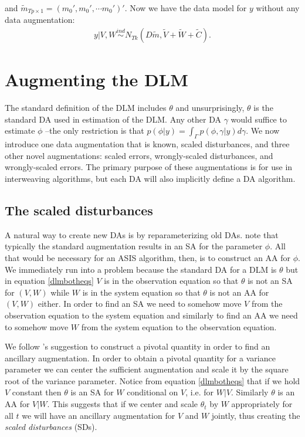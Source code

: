 \documentclass[12pt]{article}
\begin{document}
and $\tilde{m}_{Tp\times 1} = (m_0', m_0', \cdots m_0')'$. Now we have the data model for $y$ without any data augmentation:
\begin{align}
  y|V,W \stackrel{ind}{\sim} N_{Tk}(D\tilde{m}, \tilde{V} + \tilde{W} + \tilde{C}). \label{margmodel}
\end{align}

\section{Augmenting the DLM}\label{sec:DAs}

The standard definition of the DLM includes $\theta$ and unsurprisingly, $\theta$ is the standard DA used in estimation of the DLM. Any other DA $\gamma$ would suffice to estimate $\phi$ --the only restriction is that $p(\phi|y) = \int_{\Gamma} p(\phi,\gamma|y)d\gamma$. We now introduce one data augmentation that is known, scaled disturbances, and three other novel augmentations: scaled errors, wrongly-scaled disturbances, and wrongly-scaled errors. The primary purpose of these augmentations is for use in interweaving algorithms, but each DA will also implicitly define a DA algorithm.

\subsection{The scaled disturbances}\label{sec:DAs:dist}

A natural way to create new DAs is by reparameterizing old DAs. \citet{papaspiliopoulos2007general} note that typically the standard augmentation results in an SA for the parameter $\phi$. All that would be necessary for an ASIS algorithm, then, is to construct an AA for $\phi$. We immediately run into a problem because the standard DA for a DLM is $\theta$ but in equation \eqref{dlmbotheqs} $V$ is in the observation equation so that $\theta$ is not an SA for $(V,W)$ while $W$ is in the system equation so that $\theta$ is not an AA for $(V,W)$ either. In order to find an SA we need to somehow move $V$ from the observation equation to the system equation and similarly to find an AA we need to somehow move $W$ from the system equation to the observation equation.

We follow \citet{papaspiliopoulos2007general}'s suggestion to construct a pivotal quantity in order to find an ancillary augmentation. In order to obtain a pivotal quantity for a variance parameter we can center the sufficient augmentation and scale it by the square root of the variance parameter. Notice from equation \eqref{dlmbotheqs} that if we hold $V$ constant then $\theta$ is an SA for $W$ conditional on $V$, i.e. for $W|V$. Similarly $\theta$ is an AA for $V|W$. This suggests that if we center and scale $\theta_{t}$ by $W$ appropriately for all $t$ we will have an ancillary augmentation for $V$ and $W$ jointly, thus creating the {\it scaled disturbances} (SDs).
\end{document}
